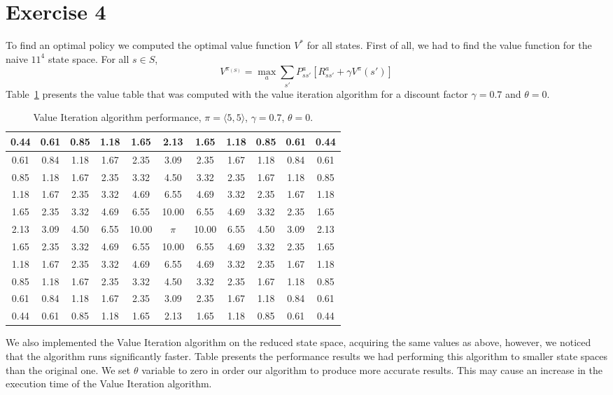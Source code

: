 \documentclass[a4paper,11pt]{article}
\begin{document}
\section*{Exercise 4}
To find an optimal policy we computed the optimal value function $V^\ast$ for all states. First of all, we had to find the value function for the naive $11^4$ state space. For all $s \in S$,
\[
V^{\pi_{(S)}} = \max_{a} \sum_{s'}P_{ss'}^a[R_{ss'}^a + \gamma V^{\pi}(s')]
\]
Table~\ref{viat} presents the value table that was computed with the value iteration algorithm for a discount factor $\gamma = 0.7$ and $\theta = 0$. 
\begin{table}[h!]
\caption{Value Iteration algorithm performance, $\pi = \langle 5,5 \rangle$, $\gamma = 0.7$, $\theta = 0$.}
\label{viat}
\begin{center}
\begin{tabular}{|c|c|c|c|c|c|c|c|c|c|c|}
\hline
0.44 & 0.61 & 0.85 & 1.18 & 1.65 & 2.13 & 1.65 & 1.18 & 0.85 & 0.61 & 0.44 \\ \hline
0.61 & 0.84 & 1.18 & 1.67 & 2.35 & 3.09 & 2.35 & 1.67 & 1.18 & 0.84 & 0.61 \\ \hline
0.85 & 1.18 & 1.67 & 2.35 & 3.32 & 4.50 & 3.32 & 2.35 & 1.67 & 1.18 & 0.85 \\ \hline
1.18 & 1.67 & 2.35 & 3.32 & 4.69 & 6.55 & 4.69 & 3.32 & 2.35 & 1.67 & 1.18 \\ \hline
1.65 & 2.35 & 3.32 & 4.69 & 6.55 & 10.00 & 6.55 & 4.69 & 3.32 & 2.35 & 1.65 \\ \hline
2.13 & 3.09 & 4.50 & 6.55 & 10.00 & $\pi$ & 10.00 & 6.55 & 4.50 & 3.09 & 2.13 \\ \hline
1.65 & 2.35 & 3.32 & 4.69 & 6.55 & 10.00 & 6.55 & 4.69 & 3.32 & 2.35 & 1.65 \\ \hline
1.18 & 1.67 & 2.35 & 3.32 & 4.69 & 6.55 & 4.69 & 3.32 & 2.35 & 1.67 & 1.18 \\ \hline
0.85 & 1.18 & 1.67 & 2.35 & 3.32 & 4.50 & 3.32 & 2.35 & 1.67 & 1.18 & 0.85 \\ \hline
0.61 & 0.84 & 1.18 & 1.67 & 2.35 & 3.09 & 2.35 & 1.67 & 1.18 & 0.84 & 0.61 \\ \hline
0.44 & 0.61 & 0.85 & 1.18 & 1.65 & 2.13 & 1.65 & 1.18 & 0.85 & 0.61 & 0.44 \\ \hline
\end{tabular}
\end{center}
\end{table}
We also implemented the Value Iteration algorithm on the reduced state space, acquiring the same values as above, however, we noticed that the algorithm runs significantly faster. Table presents the performance results we had performing this algorithm to smaller state spaces than the original one. We set $\theta$ variable to zero in order our algorithm to produce more accurate results. This may cause an increase in the execution time of the Value Iteration algorithm.
\end{document}
